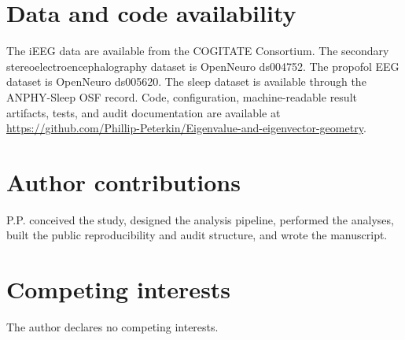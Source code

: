 \documentclass[preprint,12pt,nonatbib]{elsarticle}
\begin{document}
\section{Data and code availability}
The iEEG data are available from the COGITATE Consortium. The secondary stereoelectroencephalography dataset is OpenNeuro ds004752. The propofol EEG dataset is OpenNeuro ds005620. The sleep dataset is available through the ANPHY-Sleep OSF record. Code, configuration, machine-readable result artifacts, tests, and audit documentation are available at \url{https://github.com/Phillip-Peterkin/Eigenvalue-and-eigenvector-geometry}.

\section{Author contributions}
P.P. conceived the study, designed the analysis pipeline, performed the analyses, built the public reproducibility and audit structure, and wrote the manuscript.

\section{Competing interests}
The author declares no competing interests.

\clearpage
\printbibliography
\end{document}
